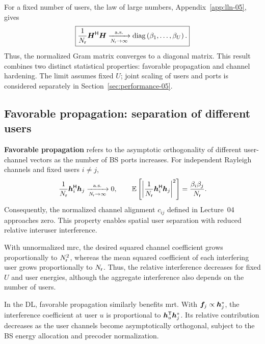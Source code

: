 For a fixed number of users, the law of large numbers, Appendix~\ref{app:lln-05}, gives
\begin{equation}
	\boxed{
		\frac{1}{N_{\mathsf{r}}}{\bm{H}}^{\mathsf{H}}\bm{H}
		\xrightarrow[N_{\mathsf{r}}\to\infty]{\mathrm{a.s.}}
		\operatorname{diag}\left(\beta_1,\ldots,\beta_U\right).
	}
	\label{eq:gramlimit-05}
\end{equation}
Thus, the normalized Gram matrix converges to a diagonal matrix. This result combines two distinct statistical properties: favorable propagation and channel hardening. The limit assumes fixed $U$; joint scaling of users and ports is considered separately in Section~\ref{sec:performance-05}.

\subsection{Favorable propagation: separation of different users}
\textbf{Favorable propagation} refers to the asymptotic orthogonality of different user-channel vectors as the number of BS ports increases. For independent Rayleigh channels and fixed users $i\ne j$,
\begin{equation}
	\frac{1}{N_{\mathsf{r}}}{\bm{h}}^{\mathsf{H}}_i\bm{h}_j
	\xrightarrow[N_{\mathsf{r}}\to\infty]{\mathrm{a.s.}}0,
	\qquad
	\mathbb{E}\left[\left|\frac{1}{N_{\mathsf{r}}}{\bm{h}}^{\mathsf{H}}_i\bm{h}_j\right|^2\right]
	=\frac{\beta_i\beta_j}{N_{\mathsf{r}}}.
	\label{eq:favorable-05}
\end{equation}
Consequently, the normalized channel alignment $c_{ij}$ defined in Lecture~04 approaches zero. This property enables spatial user separation with reduced relative interuser interference.

With unnormalized \ac{mrc}, the desired squared channel coefficient grows proportionally to $N_{\mathsf{r}}^2$, whereas the mean squared coefficient of each interfering user grows proportionally to $N_{\mathsf{r}}$. Thus, the relative interference decreases for fixed $U$ and user energies, although the aggregate interference also depends on the number of users.

In the DL, favorable propagation similarly benefits \ac{mrt}. With $\bm{f}_j\propto\bm{h}_j^*$, the interference coefficient at user $u$ is proportional to ${\bm{h}}^{\mathsf{T}}_u\bm{h}_j^*$. Its relative contribution decreases as the user channels become asymptotically orthogonal, subject to the BS energy allocation and precoder normalization.


